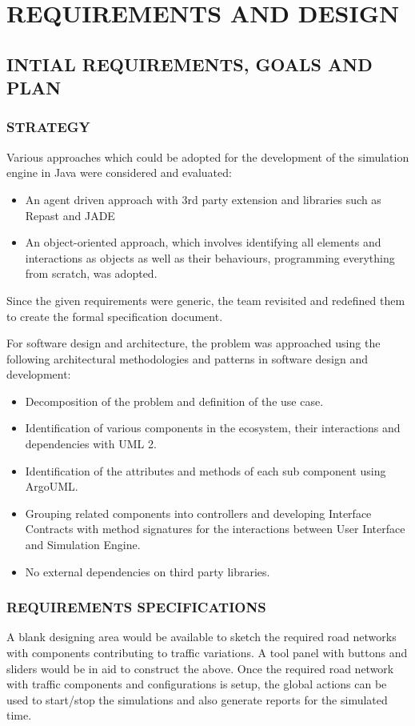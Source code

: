 \documentclass[11pt,a4paper]{article}
\begin{document}
\section{\textbf{REQUIREMENTS AND DESIGN}}
	\subsection{INTIAL REQUIREMENTS, GOALS AND PLAN}
		\subsubsection{STRATEGY}
			Various approaches which could be adopted for the development of
			the simulation engine in Java were considered and evaluated:
			\begin{itemize}
			\setlength\itemsep{0.2em}
				\item An agent driven approach with 3rd party extension and libraries such as Repast and JADE
				\item An object-oriented approach, which involves identifying all elements and interactions as objects as well as their behaviours, programming everything from scratch, was adopted.
			\end{itemize}

	Since the given requirements were generic, the team revisited 
	and redefined them to create the formal specification document.

	\setlength{\parindent}{0cm}\bigskip
	For software design and architecture, the problem was approached using
	the following architectural methodologies and patterns in software
	design and development:
	\begin{itemize}
	\setlength\itemsep{0.2em}
		\item Decomposition of the problem and definition of the use case.
		\item Identification of various components in the ecosystem, their 	interactions and dependencies with UML 2.		\item Identification of the attributes and methods of each sub component using ArgoUML.
		\item Grouping related components into controllers and developing Interface Contracts with method signatures for the interactions between User Interface and Simulation Engine.
		\item No external dependencies on third party libraries.
	\end{itemize}

	\subsubsection{REQUIREMENTS SPECIFICATIONS}
	A blank designing area would be available to sketch the required road
	networks with components contributing to traffic variations. A tool
	panel with buttons and sliders would be in aid to construct the above.
	Once the required road network with traffic components and
	configurations is setup, the global actions can be used to start/stop
	the simulations and also generate reports for the simulated time.
\end{document}
